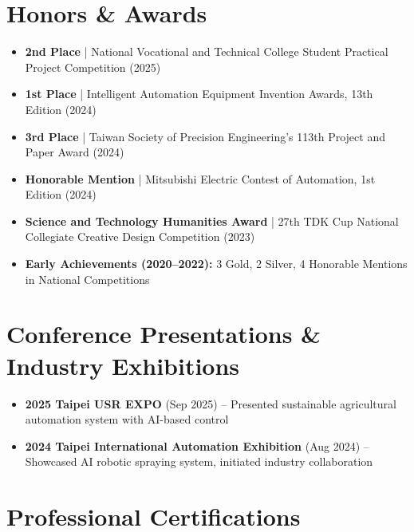 \documentclass[11pt,a4paper]{article}
\begin{document}
\section{Honors \& Awards}
\vspace{2pt}

\begin{itemize}[leftmargin=*, itemsep=2pt]
    \item \textbf{2nd Place} | National Vocational and Technical College Student Practical Project Competition (2025)
    \item \textbf{1st Place} | Intelligent Automation Equipment Invention Awards, 13th Edition (2024)
    \item \textbf{3rd Place} | Taiwan Society of Precision Engineering's 113th Project and Paper Award (2024)
    \item \textbf{Honorable Mention} | Mitsubishi Electric Contest of Automation, 1st Edition (2024)
    \item \textbf{Science and Technology Humanities Award} | 27th TDK Cup National Collegiate Creative Design Competition (2023)
    \item \textbf{Early Achievements (2020--2022):} 3 Gold, 2 Silver, 4 Honorable Mentions in National Competitions
\end{itemize}

\section{Conference Presentations \& Industry Exhibitions}
\vspace{2pt}

\begin{itemize}[leftmargin=*, itemsep=2pt]
    \item \textbf{2025 Taipei USR EXPO} (Sep 2025) -- Presented sustainable agricultural automation system with AI-based control
    \item \textbf{2024 Taipei International Automation Exhibition} (Aug 2024) -- Showcased AI robotic spraying system, initiated industry collaboration
\end{itemize}

\section{Professional Certifications}
\vspace{2pt}
\end{document}
